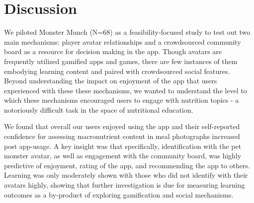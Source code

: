 

\vspace{-5pt}
\section{Discussion}

We piloted Monster Munch (N=68) as a feasibility-focused study to test out two main mechanisms: player avatar relationships and a crowdsourced community board as a resource for decision making in the app. Though avatars are frequently utilized gamified apps and games, there are few instances of them embodying learning content and paired with crowdsourced social features. Beyond understanding the impact on enjoyment of the app that users experienced with these these mechanisms, we wanted to understand the level to which these mechanisms encouraged users to engage with nutrition topics - a notoriously difficult task in the space of nutritional education.

We found that overall our users enjoyed using the app and their self-reported confidence for assessing macronutrient content in meal photographs increased post app-usage.
A key insight was that specifically, identification with the pet monster avatar, as well as engagement with the community board, was highly predictive of enjoyment, rating of the app, and recommending the app to others. 
Learning was only moderately shown with those who did not identify with their avatars highly, showing that further investigation is due for measuring learning outcomes as a by-product of exploring gamification and social mechanisms.  


\vspace{-5pt}
